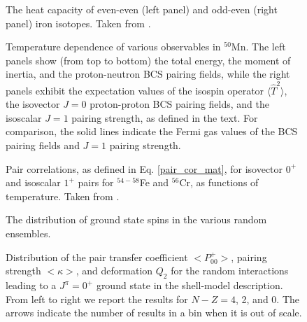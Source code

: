 \documentclass[rmp,preprint,aps,floatfix]{revtex4}
\begin{document}
\begin{figure}
\caption{The heat capacity of even-even (left panel) and
odd-even (right panel) iron isotopes. Taken from  \protect\cite{liu01}.
\label{fig:figyoram}}
\end{figure}


\begin{figure}
\caption{Temperature dependence of various observables in $^{50}$Mn.
The left panels show (from top to bottom) the total energy,
the moment of inertia, and the proton-neutron BCS pairing fields,
while the right panels exhibit
the expectation values of the isospin operator
$\langle \hat T^2 \rangle$, the isovector $J=0$ proton-proton 
BCS pairing fields, and the isoscalar $J=1$ pairing
strength, as defined in the text. For comparison,
the solid lines indicate the
Fermi gas values of the BCS pairing fields and $J=1$ pairing strength.
}
\label{fig_812}
\end{figure}


\begin{figure}
\caption{Pair correlations, as defined in Eq. \ref{pair_cor_mat},
for isovector $0^+$ and isoscalar $1^+$ pairs for $^{54-58}$Fe
and $^{56}$Cr, as functions of temperature. Taken from  \protect\cite{Langanke95b}.
}
\label{fig_813}
\end{figure}

\begin{figure}
\begin{center}
\end{center}
\caption{The distribution of ground state spins in the various
random ensembles.}
\label{fig:j0s}
\end{figure}

\begin{figure}
\begin{center}
\end{center}
\caption{Distribution of the pair transfer coefficient $<\!\!P^+_{00}\!\!>$,
pairing strength $<\!\!\kappa\!\!>$, and deformation $Q_2$ for the random 
interactions
leading to a $J^\pi=0^+$ ground state in the shell-model description.
From left to right we report the results for $N-Z=4$, 2, and 0. The arrows
indicate the number of results in a bin when it is out of scale.}
\label{kfig4}
\end{figure}
\end{document}
